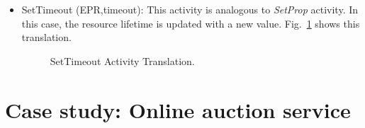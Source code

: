 \begin{itemize}
\begin{figure}[!ht]
\begin{center}
{{\begin{center}
{Figures/setProp.eps}\end{center}}}
\end{center}
\vspace{-0.7cm}
\caption{\label{setp} SetProperty Activity Translation.}
\vspace{0.5cm}
\end{figure}

\item SetTimeout (EPR,timeout):
This activity is analogous to {\em SetProp} activity. In this case, the resource lifetime is updated with a new value. Fig.~\ref{setp} shows this translation. 
\begin{figure}[!ht]
\begin{center}
\vspace{-0.5cm}
\end{center}
\vspace{-0.7cm}
\caption{\label{settim} SetTimeout Activity Translation.}
\vspace{-0.5cm}
\end{figure}
\end{itemize}


\section{Case study: Online auction service}\label{cs}

